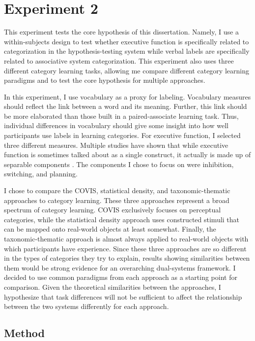 \documentclass[../dissertation.tex]{subfiles}
\begin{document}
\section{Experiment 2}

	This experiment tests the core hypothesis of this dissertation. Namely, I use a within-subjects design to test whether executive function is specifically related to categorization in the hypothesis-testing system while verbal labels are specifically related to associative system categorization. This experiment also uses three different category learning tasks, allowing me compare different category learning paradigms and to test the core hypothesis for multiple approaches. \par
	In this experiment, I use vocabulary as a proxy for labeling. Vocabulary measures should reflect the link between a word and its meaning. Further, this link should be more elaborated than those built in a paired-associate learning task. Thus, individual differences in vocabulary should give some insight into how well participants use labels in learning categories. For executive function, I selected three different measures. Multiple studies have shown that while executive function is sometimes talked about as a single construct, it actually is made up of separable components \citep{Miyake2000, Karr2018}. The components I chose to focus on were inhibition, switching, and planning. \par
	I chose to compare the COVIS, statistical density, and taxonomic-thematic approaches to category learning. These three approaches represent a broad spectrum of category learning. COVIS exclusively focuses on perceptual categories, while the statistical density approach uses constructed stimuli that can be mapped onto real-world objects at least somewhat. Finally, the taxonomic-thematic approach is almost always applied to real-world objects with which participants have experience. Since these three approaches are so different in the types of categories they try to explain, results showing similarities between them would be strong evidence for an overarching dual-systems framework. I decided to use common paradigms from each approach as a starting point for comparison. Given the theoretical similarities between the approaches, I hypothesize that task differences will not be sufficient to affect the relationship between the two systems differently for each approach.

\subsection{Method}
\end{document}
